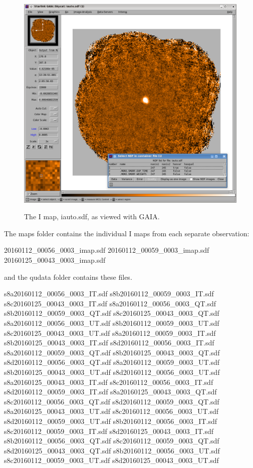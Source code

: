 \begin{figure}[t!]
\begin{center}
\includegraphics[width=0.8\linewidth]{sc22-gaia-view-iauto.png}
\label{fig:gaia-iauto}
\caption [I map in GAIA]{
  \small The I map, iauto.sdf, as viewed with GAIA.
}
\end{center}
\end{figure}

The maps folder contains the individual I maps from each separate
observation:

\begin{terminalv}
20160112_00056_0003_imap.sdf  20160112_00059_0003_imap.sdf  20160125_00043_0003_imap.sdf
\end{terminalv}

and the qudata folder contains these files.

\begin{terminalv}
s8a20160112_00056_0003_IT.sdf  s8b20160112_00059_0003_IT.sdf  s8c20160125_00043_0003_IT.sdf
s8a20160112_00056_0003_QT.sdf  s8b20160112_00059_0003_QT.sdf  s8c20160125_00043_0003_QT.sdf
s8a20160112_00056_0003_UT.sdf  s8b20160112_00059_0003_UT.sdf  s8c20160125_00043_0003_UT.sdf
s8a20160112_00059_0003_IT.sdf  s8b20160125_00043_0003_IT.sdf  s8d20160112_00056_0003_IT.sdf
s8a20160112_00059_0003_QT.sdf  s8b20160125_00043_0003_QT.sdf  s8d20160112_00056_0003_QT.sdf
s8a20160112_00059_0003_UT.sdf  s8b20160125_00043_0003_UT.sdf  s8d20160112_00056_0003_UT.sdf
s8a20160125_00043_0003_IT.sdf  s8c20160112_00056_0003_IT.sdf  s8d20160112_00059_0003_IT.sdf
s8a20160125_00043_0003_QT.sdf  s8c20160112_00056_0003_QT.sdf  s8d20160112_00059_0003_QT.sdf
s8a20160125_00043_0003_UT.sdf  s8c20160112_00056_0003_UT.sdf  s8d20160112_00059_0003_UT.sdf
s8b20160112_00056_0003_IT.sdf  s8c20160112_00059_0003_IT.sdf  s8d20160125_00043_0003_IT.sdf
s8b20160112_00056_0003_QT.sdf  s8c20160112_00059_0003_QT.sdf  s8d20160125_00043_0003_QT.sdf
s8b20160112_00056_0003_UT.sdf  s8c20160112_00059_0003_UT.sdf  s8d20160125_00043_0003_UT.sdf
\end{terminalv}


